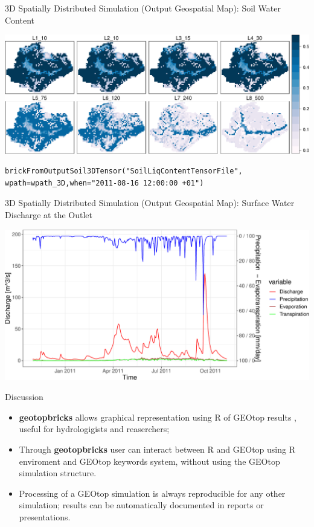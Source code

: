 \documentclass[ignorenonframetext,]{beamer}
\begin{document}
\begin{frame}[fragile]{3D Spatially Distributed Simulation (Output
Geospatial Map): Soil Water Content}

\includegraphics{presentation_files/figure-beamer/unnamed-chunk-13-1.pdf}

\begin{verbatim}
brickFromOutputSoil3DTensor("SoilLiqContentTensorFile", 
wpath=wpath_3D,when="2011-08-16 12:00:00 +01")
\end{verbatim}

\end{frame}

\begin{frame}{3D Spatially Distributed Simulation (Output Geospatial
Map): Surface Water Discharge at the Outlet}

\includegraphics{presentation_files/figure-beamer/unnamed-chunk-15-1.pdf}

\end{frame}

\begin{frame}{Discussion}

\begin{itemize}
\item
  \textbf{geotopbricks} allows graphical representation using R of
  GEOtop results , useful for hydrologigists and reaserchers;
\item
  Through \textbf{geotopbricks} user can interact between R and GEOtop
  using R enviroment and GEOtop keywords system, without using the
  GEOtop simulation structure.
\item
  Processing of a GEOtop simulation is always reproducible for any other
  simulation; results can be automatically documented in reports or
  presentations.
\end{itemize}

\end{frame}
\end{document}
